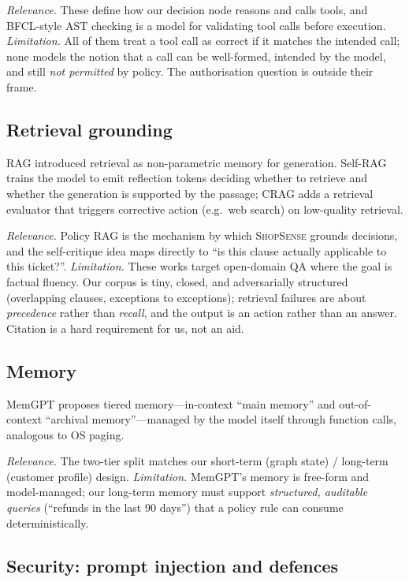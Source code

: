 \documentclass[11pt,a4paper]{article}
\newcommand{\shopsense}{\textsc{ShopSense}}
\begin{document}
\emph{Relevance.} These define how our decision node reasons and calls tools, and BFCL-style AST checking is a model for validating tool calls before execution. \emph{Limitation.} All of them treat a tool call as correct if it matches the intended call; none models the notion that a call can be well-formed, intended by the model, and still \emph{not permitted} by policy. The authorisation question is outside their frame.

\subsection{Retrieval grounding}

RAG \citep{lewis2020rag} introduced retrieval as non-parametric memory for generation. Self-RAG \citep{asai2023selfrag} trains the model to emit reflection tokens deciding whether to retrieve and whether the generation is supported by the passage; CRAG \citep{yan2024crag} adds a retrieval evaluator that triggers corrective action (e.g.\ web search) on low-quality retrieval.

\emph{Relevance.} Policy RAG is the mechanism by which \shopsense{} grounds decisions, and the self-critique idea maps directly to ``is this clause actually applicable to this ticket?''. \emph{Limitation.} These works target open-domain QA where the goal is factual fluency. Our corpus is tiny, closed, and adversarially structured (overlapping clauses, exceptions to exceptions); retrieval failures are about \emph{precedence} rather than \emph{recall}, and the output is an action rather than an answer. Citation is a hard requirement for us, not an aid.

\subsection{Memory}

MemGPT \citep{packer2023memgpt} proposes tiered memory---in-context ``main memory'' and out-of-context ``archival memory''---managed by the model itself through function calls, analogous to OS paging.

\emph{Relevance.} The two-tier split matches our short-term (graph state) / long-term (customer profile) design. \emph{Limitation.} MemGPT's memory is free-form and model-managed; our long-term memory must support \emph{structured, auditable queries} (``refunds in the last 90 days'') that a policy rule can consume deterministically.

\subsection{Security: prompt injection and defences}
\end{document}

